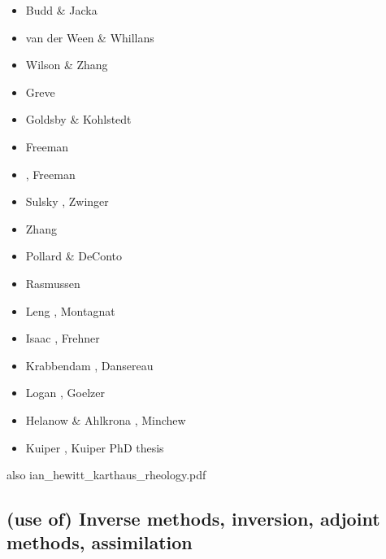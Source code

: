 \begin{scriptsize}
\begin{itemize}
\item[\nineteeneightynine] Budd \& Jacka \cite{buja89}
\item[\nineteenninety] van der Ween \& Whillans \cite{vawh90}
\item[\nineteenninetyfour] Wilson \& Zhang \cite{wizh94}
\item[\nineteenninetyseven] Greve \cite{grev97}
\item[\twothousandone] Goldsby \& Kohlstedt \cite{goko01}
\item[\twothousandfour] Freeman \etal \cite{frmm04}
\item[\twothousandsix] \cite{asbl06}, Freeman \etal \cite{frmm06}
\item[\twothousandseven] Sulsky \etal \cite{susp07}, Zwinger \etal \cite{zwgg07}
\item[\twothousandeleven] Zhang \etal \cite{zhjg11}
\item[\twothousandtwelve] Pollard \& DeConto \cite{pode12}
\item[\twothousandthirteen] Rasmussen \etal \cite{raab13}
\item[\twothousandfourteen] Leng \etal \cite{lejx14}, Montagnat \etal \cite{moad14}
\item[\twothousandfifteen] Isaac \etal \cite{issg15}, Frehner \etal \cite{frlg15}
\item[\twothousandsixteen] Krabbendam \cite{krab16}, Dansereau \etal \cite{daws16}
\item[\twothousandseventeen] Logan \etal \cite{lolc17}, Goelzer \etal \cite{gors17}
\item[\twothousandeighteen] Helanow \& Ahlkrona \cite{heah18}, Minchew \etal \cite{mimr18}
\item[\twothousandnineteen] Kuiper \etal \cite{kudd19,kuwd19}, Kuiper PhD thesis \cite{kuiper19}
\end{itemize}
\end{scriptsize}


also ian\_hewitt\_karthaus\_rheology.pdf

\subsection{(use of) Inverse methods, inversion, adjoint methods, assimilation}

